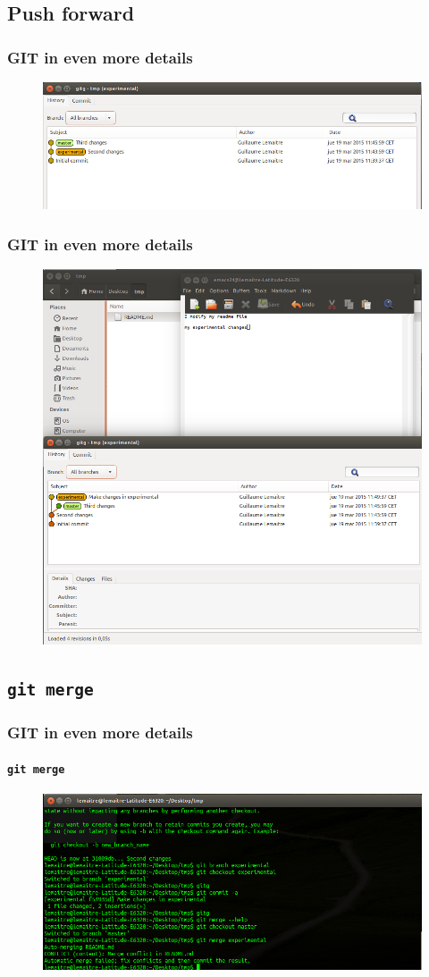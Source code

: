 \documentclass{beamer}
\begin{document}
\subsection{Push forward}

\begin{frame}
  \frametitle{GIT in even more details}
  \begin{figure}
      \centering
      \includegraphics[width=.65\textwidth]{./images/workflow/gitg-2.png}
    \end{figure}
\end{frame}

\begin{frame}
  \frametitle{GIT in even more details}
  \begin{figure}
      \centering
      \includegraphics[width=.65\textwidth]{./images/workflow/gitg-3.png}
    \end{figure}
\end{frame}

\subsection{\texttt{git merge}}

\begin{frame}
  \frametitle{GIT in even more details}
  \framesubtitle{\texttt{git merge}}
  \begin{figure}
      \centering
      \includegraphics[width=.65\textwidth]{./images/workflow/merge-conflict.png}
    \end{figure}
\end{frame}
\end{document}
